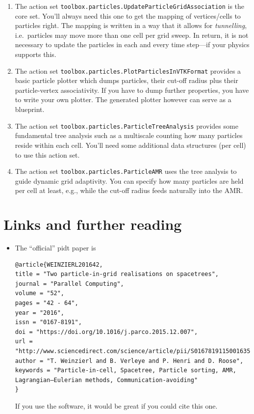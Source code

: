 \begin{enumerate}
  \item The action set \texttt{toolbox.particles.UpdateParticleGridAssociation}
  is the core set. You'll always need this one to get the mapping of
  vertices/cells to particles right. The mapping is written in a way that it
  allows for \emph{tunnelling}, i.e.~particles may move more than one cell per
  grid sweep. In return, it is not necessary to update the particles in each and
  every time step---if your physics supports this.
  \item The action set \texttt{toolbox.particles.PlotParticlesInVTKFormat}
  provides a basic particle plotter which dumps particles, their cut-off radius
  plus their particle-vertex associativity. If you have to dump further
  properties, you have to write your own plotter. The generated plotter however
  can serve as a blueprint.
  \item The action set \texttt{toolbox.particles.ParticleTreeAnalysis} provides
  some fundamental tree analysis such as a multiscale counting how many
  particles reside within each cell. You'll need some additional data structures
  (per cell) to use this action set.
  \item The action set \texttt{toolbox.particles.ParticleAMR} uses the tree
  analysis to guide dynamic grid adaptivity. You can specify how many particles
  are held per cell at least, e.g., while the cut-off radius feeds naturally
  into the AMR.
\end{enumerate}


\section*{Links and further reading}

\begin{itemize}
  \item The ``official'' pidt paper is
{\tiny \begin{verbatim}
@article{WEINZIERL201642,
title = "Two particle-in-grid realisations on spacetrees",
journal = "Parallel Computing",
volume = "52",
pages = "42 - 64",
year = "2016",
issn = "0167-8191",
doi = "https://doi.org/10.1016/j.parco.2015.12.007",
url = "http://www.sciencedirect.com/science/article/pii/S0167819115001635",
author = "T. Weinzierl and B. Verleye and P. Henri and D. Roose",
keywords = "Particle-in-cell, Spacetree, Particle sorting, AMR, Lagrangian–Eulerian methods, Communication-avoiding"
}  \end{verbatim}}
  If you use the software, it would be great if you could cite this one.
\end{itemize}


